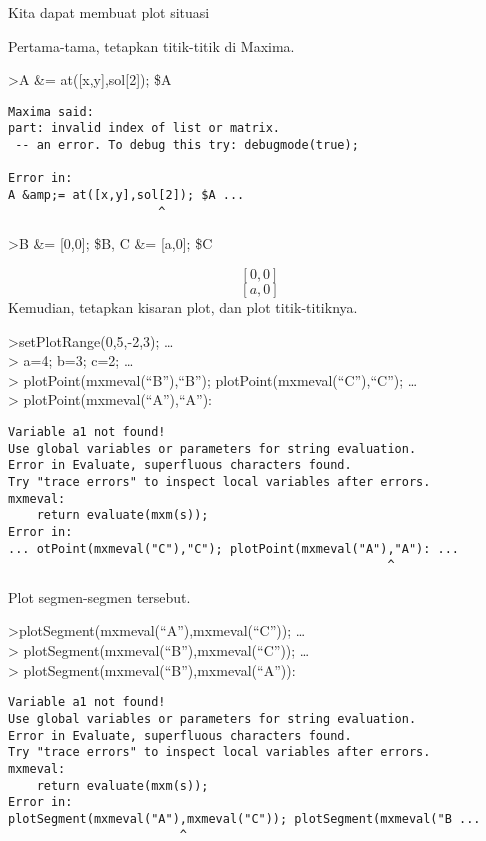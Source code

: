\documentclass[
]{book}
\begin{document}
Kita dapat membuat plot situasi

Pertama-tama, tetapkan titik-titik di Maxima.

\textgreater A \&= at({[}x,y{]},sol{[}2{]}); \$A

\begin{verbatim}
Maxima said:
part: invalid index of list or matrix.
 -- an error. To debug this try: debugmode(true);

Error in:
A &amp;= at([x,y],sol[2]); $A ...
                     ^
\end{verbatim}

\textgreater B \&= {[}0,0{]}; \$B, C \&= {[}a,0{]}; \$C

\[\left[ 0 , 0 \right] \]\[\left[ a , 0 \right] \]Kemudian, tetapkan kisaran plot, dan plot titik-titiknya.

\textgreater setPlotRange(0,5,-2,3); \ldots{}\\
\textgreater{} a=4; b=3; c=2; \ldots{}\\
\textgreater{} plotPoint(mxmeval(``B''),``B''); plotPoint(mxmeval(``C''),``C''); \ldots{}\\
\textgreater{} plotPoint(mxmeval(``A''),``A''):

\begin{verbatim}
Variable a1 not found!
Use global variables or parameters for string evaluation.
Error in Evaluate, superfluous characters found.
Try "trace errors" to inspect local variables after errors.
mxmeval:
    return evaluate(mxm(s));
Error in:
... otPoint(mxmeval("C"),"C"); plotPoint(mxmeval("A"),"A"): ...
                                                     ^
\end{verbatim}

Plot segmen-segmen tersebut.

\textgreater plotSegment(mxmeval(``A''),mxmeval(``C'')); \ldots{}\\
\textgreater{} plotSegment(mxmeval(``B''),mxmeval(``C'')); \ldots{}\\
\textgreater{} plotSegment(mxmeval(``B''),mxmeval(``A'')):

\begin{verbatim}
Variable a1 not found!
Use global variables or parameters for string evaluation.
Error in Evaluate, superfluous characters found.
Try "trace errors" to inspect local variables after errors.
mxmeval:
    return evaluate(mxm(s));
Error in:
plotSegment(mxmeval("A"),mxmeval("C")); plotSegment(mxmeval("B ...
                        ^
\end{verbatim}
\end{document}
